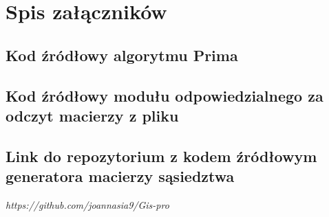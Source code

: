 \setcounter{secnumdepth}{-1}

\chapter{Spis załączników}
\setcounter{secnumdepth}{3}

\setcounter{section}{0}
\renewcommand{\thesection}{\arabic{section}}
\newcommand{\CDlitera}{$\Xi$/}

\section{Kod źródłowy algorytmu Prima}
\section{Kod źródłowy modułu odpowiedzialnego za odczyt macierzy z pliku}
\section{Link do repozytorium z kodem źródłowym generatora macierzy sąsiedztwa}
\begin{center}
	\emph{https://github.com/joannasia9/Gis-pro}
\end{center}
